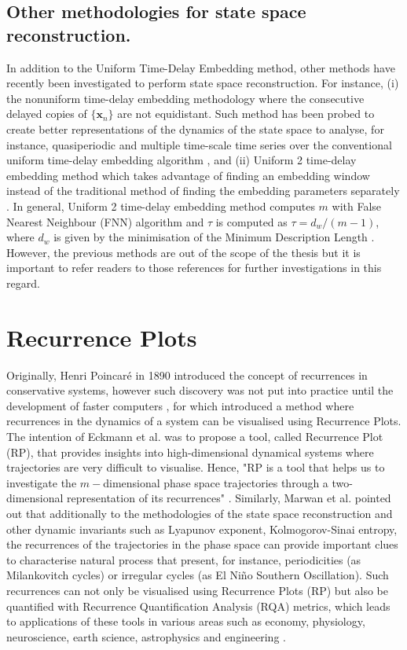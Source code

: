\subsection{Other methodologies for state space reconstruction.}
In addition to the Uniform Time-Delay Embedding method, 
other methods have recently been investigated to perform state space reconstruction.
For instance, 
(i) the nonuniform time-delay embedding methodology  
where the consecutive delayed copies of $\{ \boldsymbol{x}_n  \} $ are not
equidistant. Such method has been probed to create better representations 
of the dynamics of the state space to analyse, for instance, 
quasiperiodic and multiple time-scale time series over the conventional 
uniform time-delay embedding algorithm 
\cite{pecora2007, uzal2011, Quintana-Duque2012, Quintana-Duque2013, Quintana-Duque2016}, and
(ii) Uniform 2 time-delay embedding method which takes advantage 
of finding an embedding window instead of the traditional method 
of finding the embedding parameters separately \cite{gomezgarcia2014}.
In general, Uniform 2 time-delay embedding method computes $m$ with False Nearest Neighbour (FNN) 
algorithm and $\tau$ is computed as $\tau= d_w / (m-1)$, 
where $d_w$ is given by the minimisation of the Minimum Description Length \cite{small2004}.
However, the previous methods are out of the scope of the thesis
but it is important to refer readers 
to those references for further investigations  in this regard.






\section{Recurrence Plots}

Originally, Henri Poincar\'e in 1890 introduced the concept of recurrences 
in conservative systems, however such discovery was not put into practice 
until the development of faster computers \cite{marwan2007},
for which \cite{eckmann1987} introduced a method
where recurrences in the dynamics of a system can be visualised using Recurrence Plots.
The intention of Eckmann et al. \cite{eckmann1987}  was to propose a tool,
called Recurrence Plot (RP), that provides insights into high-dimensional dynamical 
systems where trajectories are very difficult to visualise.
Hence, "RP is a tool that helps us to investigate the 
$m-$dimensional phase space trajectories through a two-dimensional 
representation of its recurrences" \cite{marwan2015}.
Similarly, Marwan et al. \cite{marwan2015} pointed out that additionally to the methodologies
of the state space reconstruction and other dynamic invariants such as Lyapunov exponent, 
Kolmogorov-Sinai entropy, the recurrences of the trajectories in the phase space 
can provide important clues to characterise natural process that present, for
instance, periodicities (as Milankovitch cycles) or irregular cycles 
(as El Ni\~no Southern Oscillation). 
Such recurrences can not only be visualised using Recurrence Plots (RP) 
but also be quantified with Recurrence Quantification Analysis (RQA) metrics, 
which leads to applications of these tools in various areas such as economy, 
physiology, neuroscience, earth science, astrophysics and engineering \cite{marwan2007}.

